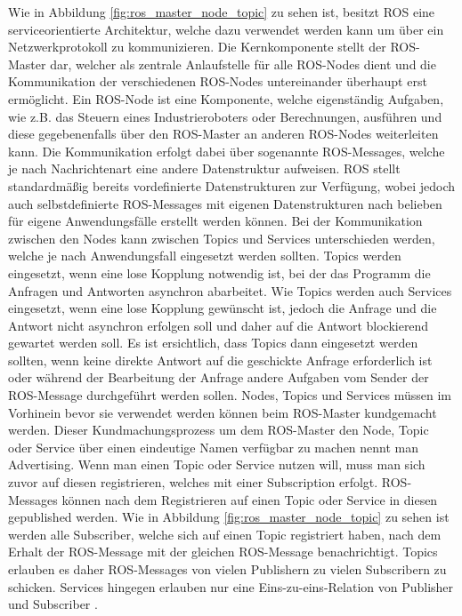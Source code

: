 Wie in Abbildung \ref{fig:ros_master_node_topic} zu sehen ist, besitzt ROS eine serviceorientierte Architektur, welche dazu verwendet werden kann um über ein Netzwerkprotokoll zu kommunizieren. Die Kernkomponente stellt der ROS-Master dar, welcher als zentrale Anlaufstelle für alle ROS-Nodes dient und die Kommunikation der verschiedenen ROS-Nodes untereinander überhaupt erst ermöglicht. Ein ROS-Node ist eine Komponente, welche eigenständig Aufgaben, wie z.B. das Steuern eines Industrieroboters oder Berechnungen, ausführen und diese gegebenenfalls über den ROS-Master an anderen ROS-Nodes weiterleiten kann. Die Kommunikation erfolgt dabei über sogenannte ROS-Messages, welche je nach Nachrichtenart eine andere Datenstruktur aufweisen. ROS stellt standardmäßig bereits vordefinierte Datenstrukturen zur Verfügung, wobei jedoch auch selbstdefinierte ROS-Messages mit eigenen Datenstrukturen nach belieben für eigene Anwendungsfälle erstellt werden können. Bei der Kommunikation zwischen den Nodes kann zwischen Topics und Services unterschieden werden, welche je nach Anwendungsfall eingesetzt werden sollten. Topics werden eingesetzt, wenn eine lose Kopplung notwendig ist, bei der das Programm die Anfragen und Antworten asynchron abarbeitet. Wie Topics werden auch Services eingesetzt, wenn eine lose Kopplung gewünscht ist, jedoch die Anfrage und die Antwort nicht asynchron erfolgen soll und daher auf die Antwort blockierend gewartet werden soll. Es ist ersichtlich, dass Topics dann eingesetzt werden sollten, wenn keine direkte Antwort auf die geschickte Anfrage erforderlich ist oder während der Bearbeitung der Anfrage andere Aufgaben vom Sender der ROS-Message durchgeführt werden sollen. Nodes, Topics und Services müssen im Vorhinein bevor sie verwendet werden können beim ROS-Master kundgemacht werden. Dieser Kundmachungsprozess um dem ROS-Master den Node, Topic oder Service über einen eindeutige Namen verfügbar zu machen nennt man Advertising. Wenn man einen Topic oder Service nutzen will, muss man sich zuvor auf diesen registrieren, welches mit einer Subscription erfolgt. ROS-Messages können nach dem Registrieren auf einen Topic oder Service in diesen gepublished werden. Wie in Abbildung \ref{fig:ros_master_node_topic} zu sehen ist werden alle Subscriber, welche sich auf einen Topic registriert haben, nach dem Erhalt der ROS-Message mit der gleichen ROS-Message benachrichtigt. Topics erlauben es daher ROS-Messages von vielen Publishern zu vielen Subscribern zu schicken. Services hingegen erlauben nur eine Eins-zu-eins-Relation von Publisher und Subscriber \cite{rosconcepts_nodate}.

